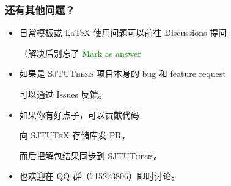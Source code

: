 \begin{frame}
  \frametitle{还有其他问题？}
      \begin{itemize}
        \item[{\faComment*[regular]}] 日常模板或 \LaTeX{} 使用问题可以前往 Discussions  提问

        （解决后别忘了 \textcolor{green}{\faCheckCircle{} Mark as answer}
        \item[{\faDotCircle[regular]}] 如果是 \textsc{SJTUThesis} 项目本身的 bug 和 feature request

        可以通过 Issues  反馈。
        \item[{\faCodeBranch}] 如果你有好点子，可以贡献代码

          向 \textsc{SJTU\TeX{}}  存储库发 PR，\par
          而后把解包结果同步到 \textsc{SJTUThesis}。
        
        \item[{\faQq}] 也欢迎在 QQ 群（715273806）即时讨论。
      \end{itemize}
\end{frame}
